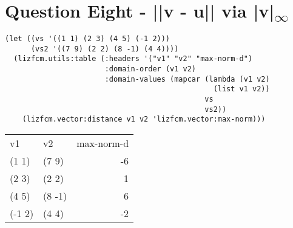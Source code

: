 \documentclass[11pt]{article}
\begin{document}
\section{Question Eight - ||v - u|| via |v|\textsubscript{\(\infty\)}}
\label{sec:org0f3b64f}
\begin{verbatim}
(let ((vs '((1 1) (2 3) (4 5) (-1 2)))
      (vs2 '((7 9) (2 2) (8 -1) (4 4))))
  (lizfcm.utils:table (:headers '("v1" "v2" "max-norm-d")
                       :domain-order (v1 v2)
                       :domain-values (mapcar (lambda (v1 v2)
                                                (list v1 v2))
                                              vs
                                              vs2))
    (lizfcm.vector:distance v1 v2 'lizfcm.vector:max-norm)))
\end{verbatim}

\begin{center}
\begin{tabular}{llr}
v1 & v2 & max-norm-d\\[0pt]
(1 1) & (7 9) & -6\\[0pt]
(2 3) & (2 2) & 1\\[0pt]
(4 5) & (8 -1) & 6\\[0pt]
(-1 2) & (4 4) & -2\\[0pt]
\end{tabular}
\end{center}
\end{document}
